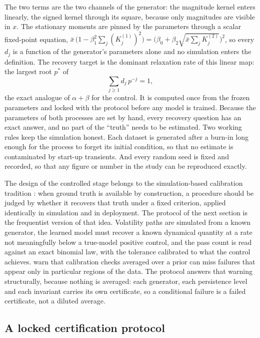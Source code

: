 \documentclass[12pt,a4paper]{article}
\begin{document}
The two terms are the two channels of the generator: the magnitude
kernel enters linearly, the signed kernel through its square, because
only magnitudes are visible in $x$. The stationary moments are pinned by
the parameters through a scalar fixed-point equation,
$\bar x\,\bigl(1 - \beta_1^2 \sum_j (K^{(1)}_j)^2\bigr) =
\bigl(\beta_0 + \beta_2 \sqrt{\bar x \sum_j K^{(2)}_j}\bigr)^2$,
so every $d_j$ is a function of the generator's parameters alone and no
simulation enters the definition. The recovery target is the dominant
relaxation rate of this linear map: the largest root $p^*$ of
\begin{equation}
\sum_{j \geq 1} d_j\, p^{-j} = 1,
\end{equation}
the exact analogue of $\alpha + \beta$ for the control. It is computed
once from the frozen parameters and locked with the protocol before any
model is trained. Because the parameters of both processes are set by hand,
every recovery question has an exact answer, and no part of the ``truth''
needs to be estimated. Two working rules keep the simulation honest.
Each dataset is generated after a burn-in long enough for the process to
forget its initial condition, so that no estimate is contaminated by
start-up transients. And every random seed is fixed and recorded, so
that any figure or number in the study can be reproduced exactly.

The design of the controlled stage belongs to the simulation-based
calibration tradition \citep{talts2020sbc}: when ground truth is
available by construction, a procedure should be judged by whether it
recovers that truth under a fixed criterion, applied identically in
simulation and in deployment. The protocol of the next section is the
frequentist version of that idea. Volatility paths are simulated from a
known generator, the learned model must recover a known dynamical
quantity at a rate not meaningfully below a true-model positive
control, and the pass count is read against an exact binomial law, with
the tolerance calibrated to what the control achieves. \citet{talts2020sbc} warn that calibration
checks averaged over a prior can miss failures that appear only in
particular regions of the data. The protocol answers that warning
structurally, because nothing is averaged: each generator, each
persistence level and each invariant carries its own certificate, so a
conditional failure is a failed certificate, not a diluted average.

\subsection{A locked certification protocol}
\end{document}
